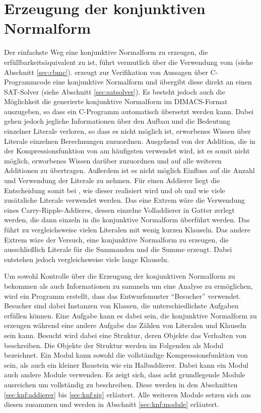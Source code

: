 \chapter{Erzeugung der konjunktiven Normalform}
\label{chp:knf}

Der einfachste Weg eine konjunktive Normalform zu erzeugen, die erfüllbarkeitsäquivalent zu  ist, führt vermutlich über die Verwendung vom 
(siehe Abschnitt \ref{sec:cbmc}).  erzeugt zur Verifikation von Aussagen über C-Programmcode eine konjunktive Normalform und übergibt diese direkt
an einen SAT-Solver (siehe Abschnitt \ref{sec:satsolver}). Es besteht jedoch auch die Möglichkeit die generierte konjunktive Normalform im DIMACS-Format auszugeben,
so dass ein C-Programm automatisch übersetzt werden kann. Dabei gehen jedoch jegliche Informationen über den Aufbau und die Bedeutung einzelner Literale verloren,
so dass es nicht möglich ist, erworbenes Wissen über Literale einzelnen Berechnungen zuzuordnen. Ausgehend von der Addition, die in der Kompressionsfunktion von
 am häufigsten verwendet wird, ist es somit nicht möglich, erworbenes Wissen darüber zuzuordnen und auf alle weiteren Additionen zu übertragen.
Außerdem ist es nicht möglich Einfluss auf die Anzahl und Verwendung der Literale zu nehmen. Für einen Addierer liegt die Entscheidung somit bei ,
wie dieser realisiert wird und ob und wie viele zusätzliche Literale verwendet werden. Das eine Extrem wäre die Verwendung eines Carry-Ripple-Addieres, dessen einzelne
Volladdierer in Gatter zerlegt werden, die dann einzeln in die konjunktive Normalform überführt werden. Das führt zu vergleichsweise vielen Literalen mit wenig
kurzen Klauseln. Das andere Extrem wäre der Versuch, eine konjunktive Normalform zu erzeugen, die ausschließlich Literale für die Summanden und die Summe erzeugt.
Dabei entstehen jedoch vergleichsweise viele lange Klauseln.

Um sowohl Kontrolle über die Erzeugung der konjunktiven Normalform zu bekommen als auch Informationen zu sammeln um eine Analyse zu ermöglichen, wird ein Programm
erstellt, dass das Entwurfsmuster "`Besucher"' \cite[301]{visitor} verwendet. Besucher sind dabei Instanzen von Klassen, die unterschiedlichste Aufgaben erfüllen können.
Eine Aufgabe kann es dabei sein, die konjunktive Normalform zu erzeugen während eine andere Aufgabe das Zählen von Literalen und Klauseln sein kann.
Besucht wird dabei eine Struktur, deren Objekte das Verhalten von  beschreiben. Die Objekte der Struktur werden im Folgenden als Modul bezeichnet.
Ein Modul kann sowohl die vollständige Kompressionsfunktion von  sein, als auch ein kleiner Baustein wie ein Halbaddierer. Dabei kann ein Modul
auch andere Module verwenden. Es zeigt sich, dass acht grundlegende Module ausreichen um  vollständig zu beschreiben. Diese werden in den Abschnitten
\ref{sec:knf:addierer} bis \ref{sec:knf:sig} erläutert. Alle weiteren Module setzen sich aus diesen zusammen und werden in Abschnitt \ref{sec:knf:module} erläutert.


